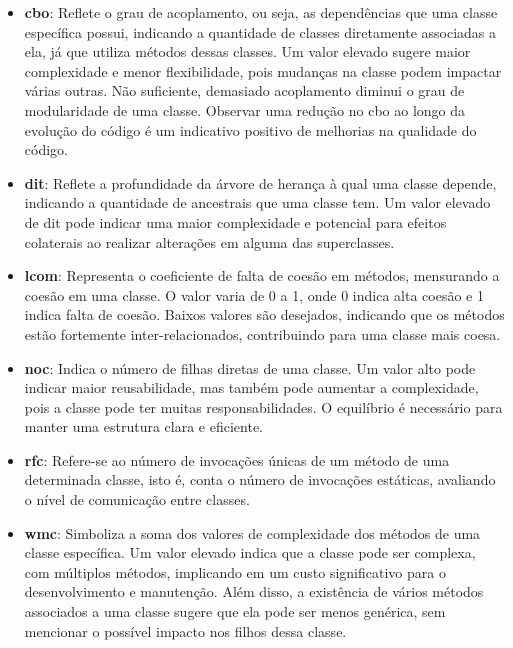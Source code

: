 \begin{itemize}
    \item \textbf{\gls{cbo}}: Reflete o grau de acoplamento, ou seja, as dependências que uma classe específica possui, indicando a quantidade de classes diretamente associadas a ela, já que utiliza métodos dessas classes. Um valor elevado sugere maior complexidade e menor flexibilidade, pois mudanças na classe podem impactar várias outras. Não suficiente, demasiado acoplamento diminui o grau de modularidade de uma classe. Observar uma redução no \gls{cbo} ao longo da evolução do código é um indicativo positivo de melhorias na qualidade do código.
    

    \item \textbf{\gls{dit}}: Reflete a profundidade da árvore de herança à qual uma classe depende, indicando a quantidade de ancestrais que uma classe tem. Um valor elevado de \gls{dit} pode indicar uma maior complexidade e potencial para efeitos colaterais ao realizar alterações em alguma das superclasses.
    
    \item \textbf{\gls{lcom}}: Representa o coeficiente de falta de coesão em métodos, mensurando a coesão em uma classe. O valor varia de 0 a 1, onde 0 indica alta coesão e 1 indica falta de coesão. Baixos valores são desejados, indicando que os métodos estão fortemente inter-relacionados, contribuindo para uma classe mais coesa.

    \item \textbf{\gls{noc}}: Indica o número de filhas diretas de uma classe. Um valor alto pode indicar maior reusabilidade, mas também pode aumentar a complexidade, pois a classe pode ter muitas responsabilidades. O equilíbrio é necessário para manter uma estrutura clara e eficiente.

    \item \textbf{\gls{rfc}}: Refere-se ao número de invocações únicas de um método de uma determinada classe, isto é, conta o número de invocações estáticas, avaliando o nível de comunicação entre classes.

    \item \textbf{\gls{wmc}}: Simboliza a soma dos valores de complexidade dos métodos de uma classe específica. Um valor elevado indica que a classe pode ser complexa, com múltiplos métodos, implicando em um custo significativo para o desenvolvimento e manutenção. Além disso, a existência de vários métodos associados a uma classe sugere que ela pode ser menos genérica, sem mencionar o possível impacto nos filhos dessa classe.
\end{itemize}

